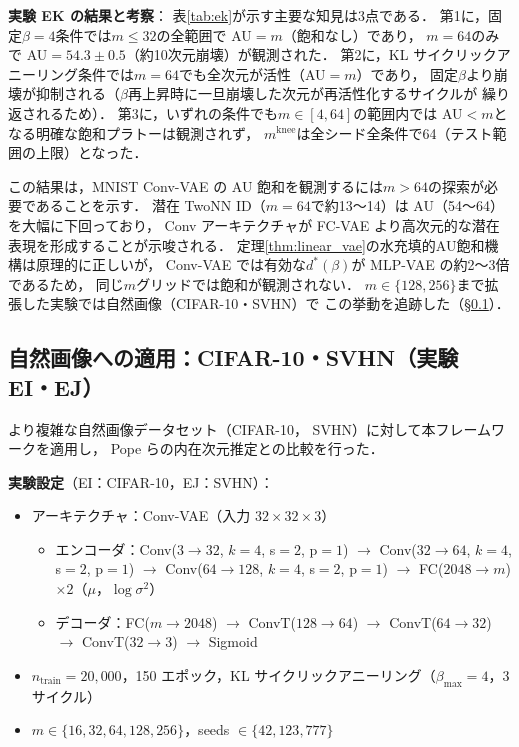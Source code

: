 \documentclass[11pt,a4paper]{jsarticle}
\newcommand{\mknee}{m^{\mathrm{knee}}}
\begin{document}
\textbf{実験 EK の結果と考察}：
表\ref{tab:ek}が示す主要な知見は3点である．
第1に，固定$\beta=4$条件では$m \le 32$の全範囲で AU$=m$（飽和なし）であり，
$m=64$のみで AU$=54.3\pm0.5$（約10次元崩壊）が観測された．
第2に，KL サイクリックアニーリング条件では$m=64$でも全次元が活性（AU$=m$）であり，
固定$\beta$より崩壊が抑制される（$\beta$再上昇時に一旦崩壊した次元が再活性化するサイクルが
繰り返されるため）．
第3に，いずれの条件でも$m \in [4,64]$の範囲内では AU$<m$となる明確な飽和プラトーは観測されず，
$\mknee$は全シード全条件で64（テスト範囲の上限）となった．

この結果は，MNIST Conv-VAE の AU 飽和を観測するには$m > 64$の探索が必要であることを示す．
潜在 TwoNN ID（$m=64$で約13〜14）は AU（54〜64）を大幅に下回っており，
Conv アーキテクチャが FC-VAE より高次元的な潜在表現を形成することが示唆される．
定理\ref{thm:linear_vae}の水充填的AU飽和機構は原理的に正しいが，
Conv-VAE では有効な$d^*(\beta)$が MLP-VAE の約2〜3倍であるため，
同じ$m$グリッドでは飽和が観測されない．
$m \in \{128, 256\}$まで拡張した実験では自然画像（CIFAR-10・SVHN）で
この挙動を追跡した（§\ref{sec:exp_natural}）．

\subsection{自然画像への適用：CIFAR-10・SVHN（実験 EI・EJ）}\label{sec:exp_natural}

より複雑な自然画像データセット（CIFAR-10\cite{krizhevsky2009learning}，
SVHN\cite{netzer2011reading}）に対して本フレームワークを適用し，
Pope ら\cite{pope2021intrinsic}の内在次元推定との比較を行った．

\textbf{実験設定}（EI：CIFAR-10，EJ：SVHN）：
\begin{itemize}
  \item アーキテクチャ：Conv-VAE（入力 $32 \times 32 \times 3$）
        \begin{itemize}
          \item エンコーダ：Conv($3\to32$, $k=4$, s$=2$, p$=1$) $\to$ Conv($32\to64$, $k=4$, s$=2$, p$=1$) $\to$
                Conv($64\to128$, $k=4$, s$=2$, p$=1$) $\to$ FC($2048 \to m$) $\times 2$（$\mu$，$\log\sigma^2$）
          \item デコーダ：FC($m \to 2048$) $\to$ ConvT($128\to64$) $\to$ ConvT($64\to32$) $\to$ ConvT($32\to3$) $\to$ Sigmoid
        \end{itemize}
  \item $n_{\mathrm{train}} = 20{,}000$，150 エポック，KL サイクリックアニーリング（$\beta_{\max}=4$，3サイクル）
  \item $m \in \{16, 32, 64, 128, 256\}$，seeds $\in \{42, 123, 777\}$
\end{itemize}
\end{document}
